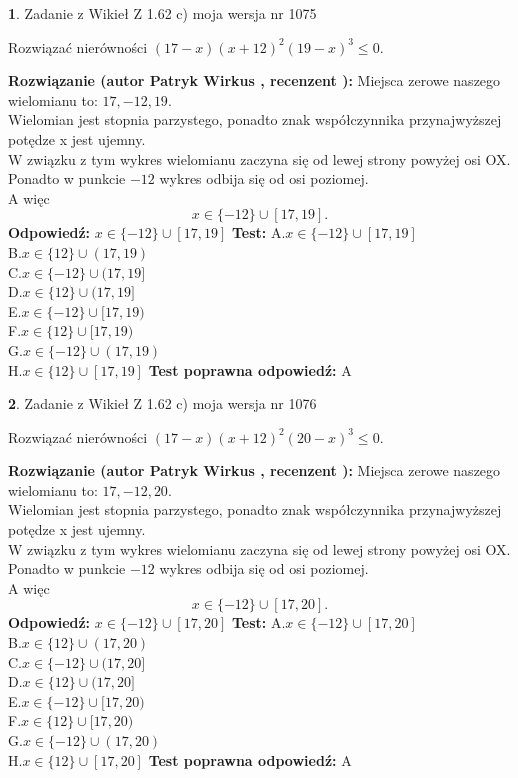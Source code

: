 \documentclass[12pt, a4paper]{article}
\theoremstyle{definition} %
\newtheorem{zad}{}
\newcommand{\zadStart}[1]{\begin{zad}#1\newline}
\newcommand{\zadStop}{\end{zad}}
\newcommand{\rozwStart}[2]{\noindent \textbf{Rozwiązanie (autor #1 , recenzent #2): }\newline}
\newcommand{\rozwStop}{\newline}
\newcommand{\odpStart}{\noindent \textbf{Odpowiedź:}\newline}
\newcommand{\odpStop}{\newline}
\newcommand{\testStart}{\noindent \textbf{Test:}\newline}
\newcommand{\testStop}{\newline}
\newcommand{\kluczStart}{\noindent \textbf{Test poprawna odpowiedź:}\newline}
\newcommand{\kluczStop}{\newline}
\begin{document}
\zadStart{Zadanie z Wikieł Z 1.62 c) moja wersja nr 1075}

Rozwiązać nierówności $(17-x)(x+12)^{2}(19-x)^{3}\le0$.
\zadStop
\rozwStart{Patryk Wirkus}{}
Miejsca zerowe naszego wielomianu to: $17, -12, 19$.\\
Wielomian jest stopnia parzystego, ponadto znak współczynnika przy\linebreak najwyższej potędze x jest ujemny.\\ W związku z tym wykres wielomianu zaczyna się od lewej strony powyżej osi OX.\\
Ponadto w punkcie $-12$ wykres odbija się od osi poziomej.\\
A więc $$x \in \{-12\} \cup [17,19].$$
\rozwStop
\odpStart
$x \in \{-12\} \cup [17,19]$
\odpStop
\testStart
A.$x \in \{-12\} \cup [17,19]$\\
B.$x \in \{12\} \cup (17,19)$\\
C.$x \in \{-12\} \cup (17,19]$\\
D.$x \in \{12\} \cup (17,19]$\\
E.$x \in \{-12\} \cup [17,19)$\\
F.$x \in \{12\} \cup [17,19)$\\
G.$x \in \{-12\} \cup (17,19)$\\
H.$x \in \{12\} \cup [17,19]$
\testStop
\kluczStart
A
\kluczStop



\zadStart{Zadanie z Wikieł Z 1.62 c) moja wersja nr 1076}

Rozwiązać nierówności $(17-x)(x+12)^{2}(20-x)^{3}\le0$.
\zadStop
\rozwStart{Patryk Wirkus}{}
Miejsca zerowe naszego wielomianu to: $17, -12, 20$.\\
Wielomian jest stopnia parzystego, ponadto znak współczynnika przy\linebreak najwyższej potędze x jest ujemny.\\ W związku z tym wykres wielomianu zaczyna się od lewej strony powyżej osi OX.\\
Ponadto w punkcie $-12$ wykres odbija się od osi poziomej.\\
A więc $$x \in \{-12\} \cup [17,20].$$
\rozwStop
\odpStart
$x \in \{-12\} \cup [17,20]$
\odpStop
\testStart
A.$x \in \{-12\} \cup [17,20]$\\
B.$x \in \{12\} \cup (17,20)$\\
C.$x \in \{-12\} \cup (17,20]$\\
D.$x \in \{12\} \cup (17,20]$\\
E.$x \in \{-12\} \cup [17,20)$\\
F.$x \in \{12\} \cup [17,20)$\\
G.$x \in \{-12\} \cup (17,20)$\\
H.$x \in \{12\} \cup [17,20]$
\testStop
\kluczStart
A
\kluczStop
\end{document}

